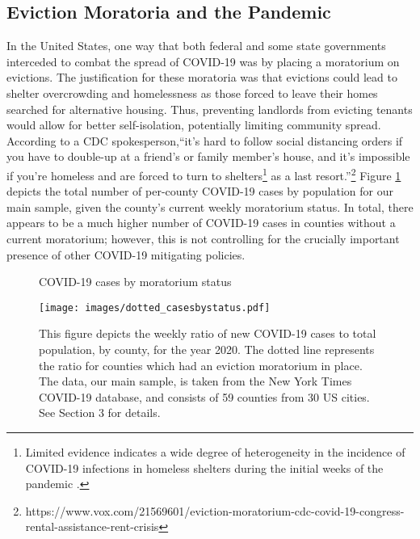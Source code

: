 \documentclass[12pt]{amsart}
\begin{document}
\subsection{Eviction Moratoria and the Pandemic}

In the United States, one way that both federal and some state governments interceded to combat the spread of COVID-19 was by placing a moratorium on evictions. The justification for these moratoria was that evictions could lead to shelter overcrowding and homelessness as those forced to leave their homes searched for alternative housing. Thus, preventing landlords from evicting tenants would allow for better self-isolation, potentially limiting community spread. According to a CDC spokesperson,``it’s hard to follow social distancing orders if you have to double-up at a friend's or family member's house, and it's impossible if you're homeless and are forced to turn to shelters\footnote{Limited evidence indicates a wide degree of heterogeneity in the incidence of COVID-19 infections in homeless shelters during the initial weeks of the pandemic \cite{mosites2020assessment}.} as a last resort.''\footnote{https://www.vox.com/21569601/eviction-moratorium-cdc-covid-19-congress-rental-assistance-rent-crisis} Figure \ref{fig:moratoriatx} depicts the total number of per-county COVID-19 cases by population for our main sample, given the county's current weekly moratorium status. In total, there appears to be a much higher number of COVID-19 cases in counties without a current moratorium; however, this is not controlling for the crucially important presence of other COVID-19 mitigating policies. 

\begin{figure}
    \centering
    \caption{COVID-19 cases by moratorium status} 
    \texttt{[image: images/dotted\_casesbystatus.pdf]}
    \caption*{This figure depicts the weekly ratio of new COVID-19 cases to total population, by county, for the year 2020. The dotted line represents the ratio for counties which had an eviction moratorium in place. The data, our main sample, is taken from the New York Times COVID-19 database, and consists of 59 counties from 30 US cities. See Section 3 for details.}
    \label{fig:moratoriatx}
\end{figure}
\end{document}
